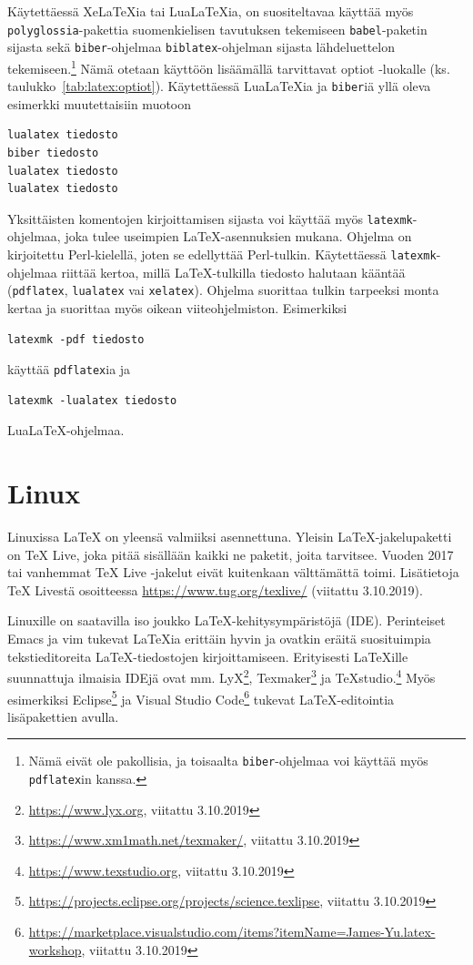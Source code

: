 Käytettäessä XeLaTeXia tai LuaLaTeXia, on suositeltavaa käyttää myös \texttt{polyglossia}-pakettia suomenkielisen tavutuksen tekemiseen \texttt{babel}-paketin sijasta sekä \texttt{biber}-ohjelmaa \texttt{biblatex}-ohjelman sijasta lähdeluettelon tekemiseen.\footnote{Nämä eivät ole pakollisia, ja toisaalta \texttt{biber}-ohjelmaa voi käyttää myös \texttt{pdflatex}in kanssa.} Nämä otetaan käyttöön lisäämällä tarvittavat optiot \uefcsthesis-luokalle (ks. taulukko~\ref{tab:latex:optiot}). Käytettäessä LuaLaTeXia ja \texttt{biber}iä yllä oleva esimerkki muutettaisiin muotoon
\begin{lstlisting}[style=cmdline]
lualatex tiedosto
biber tiedosto
lualatex tiedosto
lualatex tiedosto
\end{lstlisting}

Yksittäisten komentojen kirjoittamisen sijasta voi käyttää myös  \texttt{latexmk}-ohjelmaa, joka tulee useimpien \LaTeX-asennuksien mukana. Ohjelma on kirjoitettu Perl-kielellä, joten se edellyttää Perl-tulkin. Käytettäessä \texttt{latexmk}-ohjelmaa riittää kertoa, millä \LaTeX-tulkilla tiedosto halutaan kääntää (\texttt{pdflatex}, \texttt{lualatex} vai \texttt{xelatex}). Ohjelma suorittaa tulkin tarpeeksi monta kertaa ja suorittaa myös oikean viiteohjelmiston. Esimerkiksi
\begin{lstlisting}[style=cmdline]
latexmk -pdf tiedosto
\end{lstlisting}
käyttää \texttt{pdflatex}ia ja
\begin{lstlisting}[style=cmdline]
latexmk -lualatex tiedosto
\end{lstlisting}
LuaLaTeX-ohjelmaa.

\section{Linux}
\label{sec:latex:linux}

Linuxissa \LaTeX{} on yleensä valmiiksi asennettuna. Yleisin \LaTeX-jakelupaketti on TeX Live, joka pitää sisällään kaikki ne paketit, joita \uefcsthesis tarvitsee. Vuoden 2017 tai vanhemmat TeX Live -jakelut eivät kuitenkaan välttämättä toimi. Lisätietoja TeX Livestä osoitteessa \url{https://www.tug.org/texlive/} (viitattu 3.10.2019).

Linuxille on saatavilla iso joukko \LaTeX{}-kehitysympäristöjä (IDE). Perinteiset Emacs ja vim tukevat \LaTeX{ia} erittäin hyvin ja ovatkin eräitä suosituimpia tekstieditoreita \LaTeX-tiedostojen kirjoittamiseen. Erityisesti \LaTeX{ille} suunnattuja ilmaisia IDEjä ovat mm. LyX\footnote{\url{https://www.lyx.org}, viitattu 3.10.2019}, Texmaker\footnote{\url{https://www.xm1math.net/texmaker/}, viitattu 3.10.2019} ja TeXstudio.\footnote{\url{https://www.texstudio.org}, viitattu 3.10.2019} Myös esimerkiksi Eclipse\footnote{\url{https://projects.eclipse.org/projects/science.texlipse}, viitattu 3.10.2019} ja Visual Studio Code\footnote{\url{https://marketplace.visualstudio.com/items?itemName=James-Yu.latex-workshop}, viitattu 3.10.2019} tukevat \LaTeX-editointia lisäpakettien avulla.

